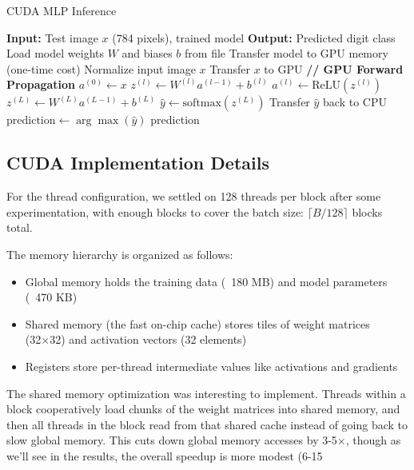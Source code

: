\documentclass[conference]{IEEEtran}
\begin{document}
\begin{algorithm}
\caption{CUDA MLP Inference}
\label{alg:inference}
\begin{algorithmic}[1]
\STATE \textbf{Input:} Test image $x$ (784 pixels), trained model
\STATE \textbf{Output:} Predicted digit class
\STATE
\STATE Load model weights $W$ and biases $b$ from file
\STATE Transfer model to GPU memory (one-time cost)
\STATE Normalize input image $x$
\STATE Transfer $x$ to GPU
\STATE
\STATE \textbf{// GPU Forward Propagation}
\STATE $a^{(0)} \leftarrow x$
    \STATE $z^{(l)} \leftarrow W^{(l)} a^{(l-1)} + b^{(l)}$
    \STATE $a^{(l)} \leftarrow \text{ReLU}(z^{(l)})$
\ENDFOR
\STATE $z^{(L)} \leftarrow W^{(L)} a^{(L-1)} + b^{(L)}$
\STATE $\hat{y} \leftarrow \text{softmax}(z^{(L)})$
\STATE
\STATE Transfer $\hat{y}$ back to CPU
\STATE $\text{prediction} \leftarrow \arg\max(\hat{y})$
\RETURN prediction
\end{algorithmic}
\end{algorithm}

\subsection{CUDA Implementation Details}

For the thread configuration, we settled on 128 threads per block after some experimentation, with enough blocks to cover the batch size: $\lceil B/128 \rceil$ blocks total.

The memory hierarchy is organized as follows:
\begin{itemize}
\item Global memory holds the training data (~180 MB) and model parameters (~470 KB)
\item Shared memory (the fast on-chip cache) stores tiles of weight matrices (32×32) and activation vectors (32 elements)
\item Registers store per-thread intermediate values like activations and gradients
\end{itemize}

The shared memory optimization was interesting to implement. Threads within a block cooperatively load chunks of the weight matrices into shared memory, and then all threads in the block read from that shared cache instead of going back to slow global memory. This cuts down global memory accesses by 3-5×, though as we'll see in the results, the overall speedup is more modest (6-15%
\end{document}
